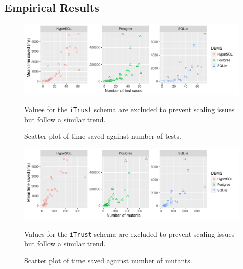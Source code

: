 	\subsection{Empirical Results}

		\begin{table}[t]
			\caption{\label{tbl:time_saved_by_dbms_table}
				Time saving summary.
			}\vspace{1em}
			\scriptsize
			\centering
		\end{table}

		\begin{figure}[t]
			\centering
			\includegraphics[width=6in]{graphics/time_saved_vs_tests_scatter_noitrust_facetdbms.pdf}
			\caption{Scatter plot of time saved against number of tests.}
			{\small Values for the \texttt{iTrust} schema are excluded to prevent scaling issues but follow a similar trend.}
		\end{figure}

		\begin{figure}[t]
			\centering
			\includegraphics[width=6in]{graphics/time_saved_vs_mutants_scatter_noitrust_facetdbms.pdf}
			\caption{Scatter plot of time saved against number of mutants.}
			{\small Values for the \texttt{iTrust} schema are excluded to prevent scaling issues but follow a similar trend.}
		\end{figure}

